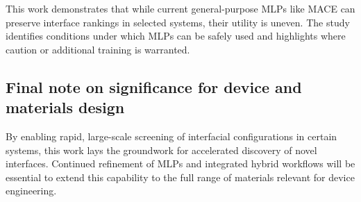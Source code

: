 This work demonstrates that while current general-purpose MLPs like MACE can preserve interface rankings in selected
systems, their utility is uneven. The study identifies conditions under which MLPs can be safely used and highlights
where caution or additional training is warranted.

\subsection{Final note on significance for device and materials design}

By enabling rapid, large-scale screening of interfacial configurations in certain systems, this work lays the
groundwork for accelerated discovery of novel interfaces. Continued refinement of MLPs and integrated hybrid workflows
will be essential to extend this capability to the full range of materials relevant for device engineering.

